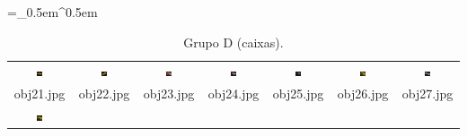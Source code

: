 \begin{table}[H]
  \centering
  \caption{Grupo D (caixas).}
  \tabulinesep =_0.5em^0.5em
  \everyrow{\tabucline[0.4pt]-}
  \begin{tabu}{|ccccccc|}
    \includegraphics[width=0.1\textwidth,height=0.1\textwidth]{imagens/coil_100/caixas/obj1__35.png} &
    \includegraphics[width=0.1\textwidth,height=0.1\textwidth]{imagens/coil_100/caixas/obj1__35_1.png} &
    \includegraphics[width=0.1\textwidth,height=0.1\textwidth]{imagens/coil_100/caixas/obj31__45.png} &
    \includegraphics[width=0.1\textwidth,height=0.1\textwidth]{imagens/coil_100/caixas/obj46__45.png} &
    \includegraphics[width=0.1\textwidth,height=0.1\textwidth]{imagens/coil_100/caixas/obj46__45_1.png} &
    \includegraphics[width=0.1\textwidth,height=0.1\textwidth]{imagens/coil_100/caixas/obj54__55.png} &
    \includegraphics[width=0.1\textwidth,height=0.1\textwidth]{imagens/coil_100/caixas/obj67__50.png}
    \\
    \scriptsize{obj21.jpg} & \scriptsize{obj22.jpg} & \scriptsize{obj23.jpg} &
    \scriptsize{obj24.jpg} & \scriptsize{obj25.jpg} & \scriptsize{obj26.jpg} &
    \scriptsize{obj27.jpg}
    \\
    \includegraphics[width=0.1\textwidth,height=0.1\textwidth]{imagens/coil_100/caixas/obj79__45.png} &

\end{tabu}
\end{table}
